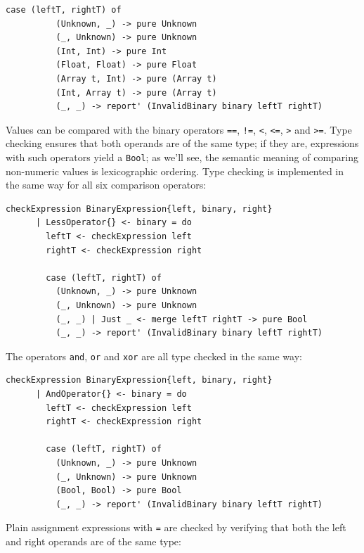 \documentclass[UdineBachThesis,american,11pt]{PhdThesis}
\begin{document}
  \pagebreak

  \begin{Verbatim}[gobble=4,fontsize=\small]
        case (leftT, rightT) of
          (Unknown, _) -> pure Unknown
          (_, Unknown) -> pure Unknown
          (Int, Int) -> pure Int
          (Float, Float) -> pure Float
          (Array t, Int) -> pure (Array t)
          (Int, Array t) -> pure (Array t)
          (_, _) -> report' (InvalidBinary binary leftT rightT)
  \end{Verbatim}

  Values can be compared with the binary operators \mbox{\texttt{==}},
  \mbox{\texttt{!=}}, \texttt{<}, \mbox{\texttt{<=}}, \texttt{>} and
  \mbox{\texttt{>=}}. Type checking ensures that both operands are of the same
  type; if they are, expressions with such operators yield a
  \mbox{\texttt{Bool}}; as we'll see, the semantic meaning of comparing
  non-numeric values is lexicographic ordering. Type checking is implemented in
  the same way for all six comparison operators:

  \begin{Verbatim}[gobble=4,fontsize=\small]
    checkExpression BinaryExpression{left, binary, right}
      | LessOperator{} <- binary = do
        leftT <- checkExpression left
        rightT <- checkExpression right

        case (leftT, rightT) of
          (Unknown, _) -> pure Unknown
          (_, Unknown) -> pure Unknown
          (_, _) | Just _ <- merge leftT rightT -> pure Bool
          (_, _) -> report' (InvalidBinary binary leftT rightT)
  \end{Verbatim}

  The operators \mbox{\texttt{and}}, \mbox{\texttt{or}} and \mbox{\texttt{xor}}
  are all type checked in the same way:

  \begin{Verbatim}[gobble=4,fontsize=\small]
    checkExpression BinaryExpression{left, binary, right}
      | AndOperator{} <- binary = do
        leftT <- checkExpression left
        rightT <- checkExpression right

        case (leftT, rightT) of
          (Unknown, _) -> pure Unknown
          (_, Unknown) -> pure Unknown
          (Bool, Bool) -> pure Bool
          (_, _) -> report' (InvalidBinary binary leftT rightT)
  \end{Verbatim}

  Plain assignment expressions with \texttt{=} are checked by verifying that
  both the left and right operands are of the same type:
\end{document}
